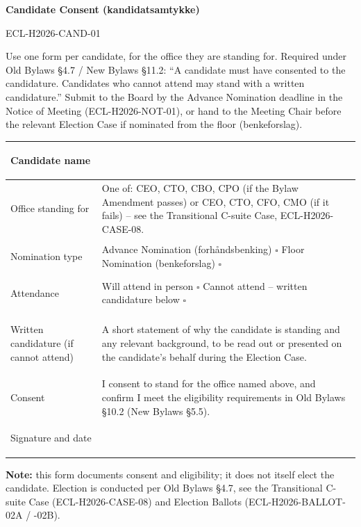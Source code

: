 \documentclass{../../../Common/Latex/Templates/rapport}
\date{[DATE OF GENERAL ASSEMBLY -- TBD]}
\begin{document}
\reportmainmatter
\small
\setlength{\parindent}{0pt}
\setlength{\tabcolsep}{6pt}
\renewcommand{\arraystretch}{1.2}

\begin{center}
  {\Large\bfseries Candidate Consent (kandidatsamtykke)}\par
  \vspace{0.15cm}
  {\normalsize ECL-H2026-CAND-01}\par
\end{center}

\vspace{0.2cm}
Use one form per candidate, for the office they are standing for. Required under Old Bylaws \S4.7 / New Bylaws \S11.2: ``A candidate must have consented to the candidature. Candidates who cannot attend may stand with a written candidature.'' Submit to the Board by the Advance Nomination deadline in the Notice of Meeting (ECL-H2026-NOT-01), or hand to the Meeting Chair before the relevant Election Case if nominated from the floor (benkeforslag).

\vspace{0.4cm}
\begin{tabularx}{\textwidth}{|>{\bfseries\raggedright\arraybackslash}p{4.2cm}|X|}
  \hline
  Candidate name                         & \rule{0pt}{1.2cm}                                                                                                                                                                \\
  \hline
  Office standing for                    & \rule{0pt}{1.2cm}One of: CEO, CTO, CBO, CPO (if the Bylaw Amendment passes) or CEO, CTO, CFO, CMO (if it fails) -- see the Transitional C-suite Case, ECL-H2026-CASE-08.         \\
  \hline
  Nomination type                        & \rule{0pt}{1.2cm}Advance Nomination (forhåndsbenking) \quad $\square$ \quad Floor Nomination (benkeforslag) \quad $\square$                                                      \\
  \hline
  Attendance                             & \rule{0pt}{1.2cm}Will attend in person \quad $\square$ \quad Cannot attend -- written candidature below \quad $\square$                                                          \\
  \hline
  Written candidature (if cannot attend) & \rule{0pt}{3.2cm}A short statement of why the candidate is standing and any relevant background, to be read out or presented on the candidate's behalf during the Election Case. \\
  \hline
  Consent                                & \rule{0pt}{1.6cm}I consent to stand for the office named above, and confirm I meet the eligibility requirements in Old Bylaws \S10.2 (New Bylaws \S5.5).                         \\
  \hline
  Signature and date                     & \rule{0pt}{1.4cm}                                                                                                                                                                \\
  \hline
\end{tabularx}

\vfill
\textbf{Note:} this form documents consent and eligibility; it does not itself elect the candidate. Election is conducted per Old Bylaws \S4.7, see the Transitional C-suite Case (ECL-H2026-CASE-08) and Election Ballots (ECL-H2026-BALLOT-02A / -02B).
\end{document}
